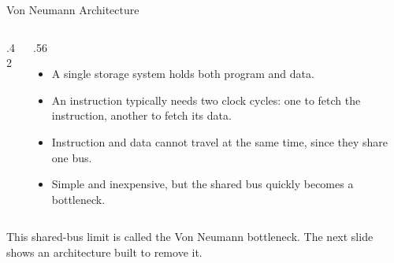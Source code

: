 \documentclass[9pt,aspectratio=169,xcolor=table]{beamer}
\begin{document}
\begin{frame}{Von Neumann Architecture}
    \begin{columns}[c]
    \begin{column}{.42\textwidth}
        \begin{center}
        \end{center}
    \end{column}
    \begin{column}{.56\textwidth}
        \begin{itemize}
            \item A \alert{single} storage system holds both program and data.
            \item An instruction typically needs \alert{two clock cycles}: one to fetch the instruction, another to fetch its data.
            \item Instruction and data cannot travel at the same time, since they share one bus.
            \item Simple and inexpensive, but the shared bus quickly becomes a bottleneck.
        \end{itemize}
    \end{column}
    \end{columns}
    \vspace{2mm}
    {\small This shared-bus limit is called the \alert{Von Neumann bottleneck}. The next slide shows an architecture built to remove it.}
\end{frame}
\end{document}
